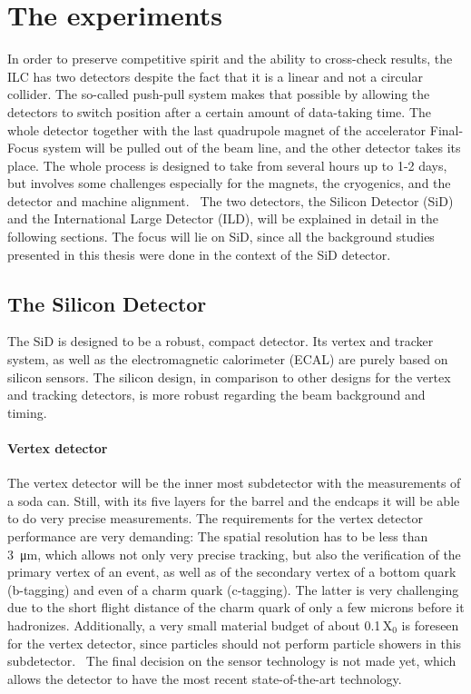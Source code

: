\newpage
\section{The experiments}
\label{ILC:detectors}
In order to preserve competitive spirit and the ability to cross-check results, the ILC has two detectors despite the fact that it is a linear and not a circular collider.
The so-called push-pull system makes that possible by allowing the detectors to switch position after a certain amount of data-taking time.
The whole detector together with the last quadrupole magnet of the accelerator Final-Focus system will be pulled out of the beam line, and the other detector takes its place.
The whole process is designed to take from several hours up to 1-2 days, but involves some challenges especially for the magnets, the cryogenics, and the detector and machine alignment.~\cite[p. 28-29]{TDR1}
The two detectors, the Silicon Detector (SiD) and the International Large Detector (ILD), will be explained in detail in the following sections.
The focus will lie on SiD, since all the background studies presented in this thesis were done in the context of the SiD detector.

\subsection{The Silicon Detector}
The SiD is designed to be a robust, compact detector.
Its vertex and tracker system, as well as the electromagnetic calorimeter (ECAL) are purely based on silicon sensors.
The silicon design, in comparison to other designs for the vertex and tracking detectors, is more robust regarding the beam background and timing.~\cite[cf. p. 57ff]{TDR4}
\paragraph{Vertex detector}
The vertex detector will be the inner most subdetector with the measurements of a soda can.
Still, with its five layers for the barrel and the endcaps it will be able to do very precise measurements.
The requirements for the vertex detector performance are very demanding:
The spatial resolution has to be less than \SI{3}{\micro\meter}, which allows not only very precise tracking, but also the verification of the primary vertex of an event, as well as of the secondary vertex of a bottom quark (b-tagging) and even of a charm quark (c-tagging).
The latter is very challenging due to the short flight distance of the charm quark of only a few microns before it hadronizes.
Additionally, a very small material budget of about 0.1\,X$_0$ is foreseen for the vertex detector, since particles should not perform particle showers in this subdetector.~\cite{SiD_Update}
The final decision on the sensor technology is not made yet, which allows the detector to have the most recent state-of-the-art technology.
